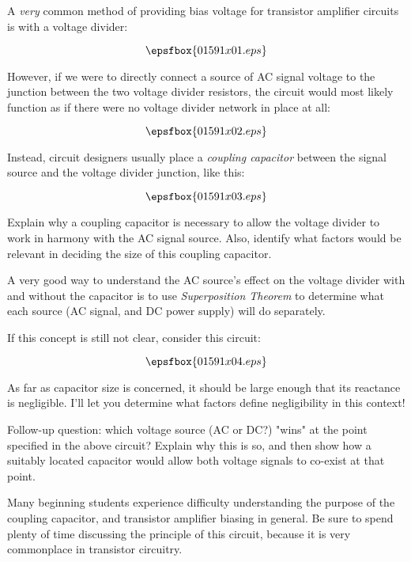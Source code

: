 

A {\it very} common method of providing bias voltage for transistor amplifier circuits is with a voltage divider:

$$\epsfbox{01591x01.eps}$$

However, if we were to directly connect a source of AC signal voltage to the junction between the two voltage divider resistors, the circuit would most likely function as if there were no voltage divider network in place at all:

$$\epsfbox{01591x02.eps}$$

Instead, circuit designers usually place a {\it coupling capacitor} between the signal source and the voltage divider junction, like this:

$$\epsfbox{01591x03.eps}$$

Explain why a coupling capacitor is necessary to allow the voltage divider to work in harmony with the AC signal source.  Also, identify what factors would be relevant in deciding the size of this coupling capacitor.







A very good way to understand the AC source's effect on the voltage divider with and without the capacitor is to use {\it Superposition Theorem} to determine what each source (AC signal, and DC power supply) will do separately.

If this concept is still not clear, consider this circuit:

$$\epsfbox{01591x04.eps}$$

As far as capacitor size is concerned, it should be large enough that its reactance is negligible.  I'll let you determine what factors define negligibility in this context!

\vskip 10pt

Follow-up question: which voltage source (AC or DC?) "wins" at the point specified in the above circuit?  Explain why this is so, and then show how a suitably located capacitor would allow both voltage signals to co-exist at that point.







Many beginning students experience difficulty understanding the purpose of the coupling capacitor, and transistor amplifier biasing in general.  Be sure to spend plenty of time discussing the principle of this circuit, because it is very commonplace in transistor circuitry.




